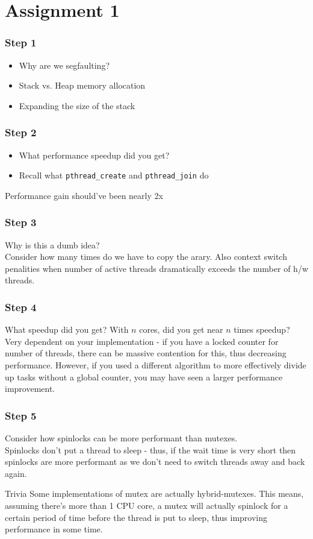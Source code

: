 \documentclass{beamer}
\begin{document}
\section{Assignment 1}
\begin{frame}
  \frametitle{Step 1}
  \begin{itemize}
    \item Why are we segfaulting?
    \item Stack vs. Heap memory allocation
    \item Expanding the size of the stack
  \end{itemize}
\end{frame}
\begin{frame}
  \frametitle{Step 2}
  \begin{itemize}
    \item What performance speedup did you get?
    \item Recall what \texttt{pthread\_create} and \texttt{pthread\_join} do
  \end{itemize}
  \pause
  Performance gain should've been nearly 2x
\end{frame}
\begin{frame}
  \frametitle{Step 3}
  Why is this a dumb idea?\\
  \pause
  Consider how many times do we have to copy the arary. Also context switch penalities when number of active threads dramatically exceeds the number of h/w threads.
\end{frame}
\begin{frame}
  \frametitle{Step 4}
  What speedup did you get? With $n$ cores, did you get near $n$ times speedup?\\
  \pause
  Very dependent on your implementation - if you have a locked counter for number of threads, there can be massive contention for this, thus decreasing performance. However, if you used a different algorithm to more effectively divide up tasks without a global counter, you may have seen a larger performance improvement.
\end{frame}
\begin{frame}
  \frametitle{Step 5}
  Consider how spinlocks can be more performant than mutexes.\\
  \pause
  Spinlocks don't put a thread to sleep - thus, if the wait time is very short then spinlocks are more performant as we don't need to switch threads away and back again.
  \begin{exampleblock}{Trivia}
    Some implementations of mutex are actually hybrid-mutexes. This means, assuming there's more than 1 CPU core, a mutex will actually spinlock for a certain period of time before the thread is put to sleep, thus improving performance in some time.
  \end{exampleblock}
\end{frame}
\end{document}
